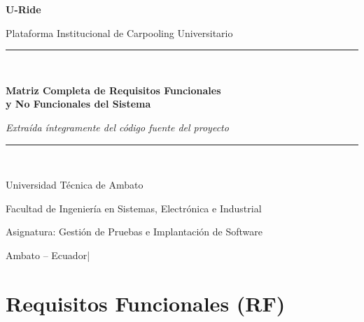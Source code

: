 \documentclass[12pt,a4paper]{article}
\begin{document}
\begin{titlepage}
  \centering
  \vspace*{1.5cm}
  {\Huge\bfseries\color{primary} U-Ride\par}
  \vspace{0.3cm}
  {\large Plataforma Institucional de Carpooling Universitario\par}
  \vspace{1.2cm}
  \rule{\linewidth}{1.5pt}\\[0.4cm]
  {\LARGE\bfseries Matriz Completa de Requisitos Funcionales\\y No Funcionales del Sistema\par}
  \vspace{0.2cm}
  {\small\textit{Extraída íntegramente del código fuente del proyecto}\par}
  \rule{\linewidth}{1.5pt}\\[1.8cm]
  {\large Universidad Técnica de Ambato\par}
  {\normalsize Facultad de Ingeniería en Sistemas, Electrónica e Industrial\par}
  \vspace{0.5cm}
  {\normalsize Asignatura: Gestión de Pruebas e Implantación de Software\par}
  \vfill
  {\normalsize Ambato -- Ecuador\quad|\quad\the\year\par}
\end{titlepage}

\newpage
\tableofcontents
\newpage

\section{Requisitos Funcionales (RF)}
\end{document}
